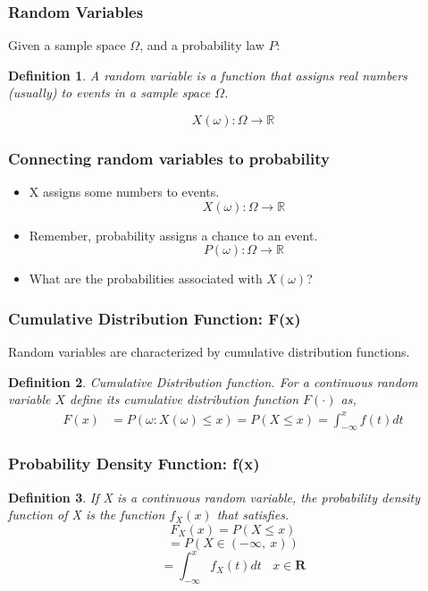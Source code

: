 \documentclass[aspectratio=169, handout]{beamer}
\newtheorem{defn}{Definition}
\numberwithin{equation}{section}
\begin{document}
\begin{frame}
\frametitle{Random Variables}
Given a sample space $\Omega$, and a probability law $P$:
\begin{defn}
A \emph{random variable} is a \alert{function} that assigns real numbers (usually) to events in a sample space $\Omega$.
\end{defn}
$$X(\omega): \Omega \to \mathbb{R}$$

\end{frame}


\begin{frame}
\frametitle{Connecting random variables to probability}
\begin{itemize}
\item X assigns some numbers to events.\pause
$$X(\omega): \Omega \to \mathbb{R}$$
\item Remember, probability assigns a chance to an event.\pause
$$P(\omega): \Omega \to \mathbb{R}$$
\item What are the probabilities associated with $X(\omega)$?\pause
\end{itemize}
\end{frame}





\begin{frame}
\frametitle{Cumulative Distribution Function: F(x)} 

Random variables are characterized by cumulative distribution functions.\pause

\begin{defn} 
Cumulative Distribution function.  For a continuous random variable $X$ define its cumulative distribution function $F(\cdot )$ as, 
\begin{align*} 
F(x) &=P(\omega: X(\omega)\leq x)= P(X \leq x) = \int_{-\infty} ^{x} f(t) dt 
\end{align*}
\end{defn}
\end{frame}


\begin{frame}
\frametitle{Probability Density Function: f(x)}
\begin{defn}
If X is a continuous random variable, the probability density function of X is the function $f_X(x)$ that satisfies.
$$F_X(x)=P(X\leq x)$$
$$=P(X\in (-\infty,\ x))$$
$$=\int_{-\infty}^{x} f_X(t)dt\ \ \ \ x\in \textbf{R}$$
\end{defn}
\pause

\begin{center}
\end{center}
\end{frame}
\end{document}
